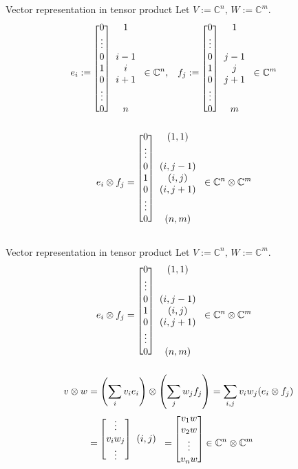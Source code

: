 \documentclass[10pt]{beamer}
\begin{document}
\begin{frame}{Vector representation in tensor product}
Let $V:=\mathbb{C}^n,\,W:=\mathbb{C}^m$.
\small
\begin{align*}
e_i&:=\begin{blockarray}{[c]c}0&1\\\vdots\\0&i-1\\1&i\\0&i+1\\\vdots\\0&n\end{blockarray}\in\mathbb{C}^n,&
f_j&:=\begin{blockarray}{[c]c}0&1\\\vdots\\0&j-1\\1&j\\0&j+1\\\vdots\\0&m\end{blockarray}\in\mathbb{C}^m&
\end{align*}
\begin{align*}
e_i\otimes f_j&=\begin{blockarray}{[c]c}0&(1,1)\\\vdots\\0&(i,j-1)\\1&(i,j)\\0&(i,j+1)\\\vdots\\0&(n,m)\end{blockarray}\in\mathbb{C}^n\otimes\mathbb{C}^m
\end{align*}
\end{frame}

\begin{frame}{Vector representation in tensor product}
Let $V:=\mathbb{C}^n,\,W:=\mathbb{C}^m$.
\small
\begin{align*}
e_i\otimes f_j&=\begin{blockarray}{[c]c}0&(1,1)\\\vdots\\0&(i,j-1)\\1&(i,j)\\0&(i,j+1)\\\vdots\\0&(n,m)\end{blockarray}\in\mathbb{C}^n\otimes\mathbb{C}^m
\end{align*}
\begin{align*}
v\otimes w&=\left(\sum_i v_i e_i\right)\otimes\left(\sum_j w_j f_j\right) = \sum_{i,j} v_i w_j (e_i\otimes f_j)\\
&=
\begin{blockarray}{[c]c}\vdots\\v_iw_j&(i,j)\\\vdots\end{blockarray}=\begin{blockarray}{[c]}v_1 w\\v_2 w\\\vdots\\v_nw\end{blockarray}\in\mathbb{C}^n\otimes\mathbb{C}^m
\end{align*}
\end{frame}
\end{document}
